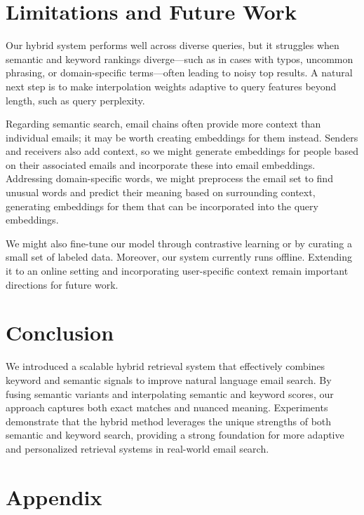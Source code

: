 \documentclass{article}
\begin{document}
\section{Limitations and Future Work}
Our hybrid system performs well across diverse queries, but it struggles when semantic and keyword rankings diverge—such as in cases with typos, uncommon phrasing, or domain-specific terms—often leading to noisy top results. A natural next step is to make interpolation weights adaptive to query features beyond length, such as query perplexity.

Regarding semantic search, email chains often provide more context than individual emails; it may be worth creating embeddings for them instead. Senders and receivers also add context, so we might generate embeddings for people based on their associated emails and incorporate these into email embeddings. Addressing domain-specific words, we might preprocess the email set to find unusual words and predict their meaning based on surrounding context, generating embeddings for them that can be incorporated into the query embeddings. 

We might also fine-tune our model through contrastive learning or by curating a small set of labeled data. Moreover, our system currently runs offline. Extending it to an online setting and incorporating user-specific context remain important directions for future work.

\section{Conclusion}

We introduced a scalable hybrid retrieval system that effectively combines keyword and semantic signals to improve natural language email search. By fusing semantic variants and interpolating semantic and keyword scores, our approach captures both exact matches and nuanced meaning. Experiments demonstrate that the hybrid method leverages the unique strengths of both semantic and keyword search, providing a strong foundation for more adaptive and personalized retrieval systems in real-world email search.

 
\newpage








\newpage
\appendix

\section*{Appendix}
\end{document}
